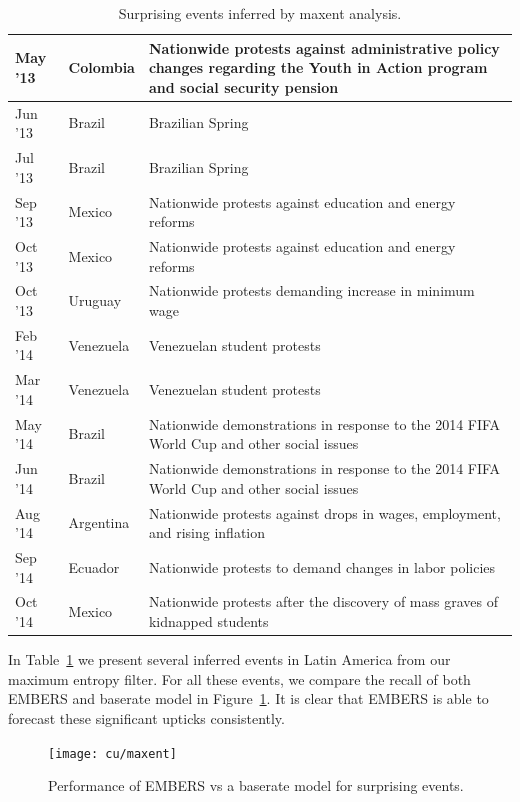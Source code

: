 \begin{table}
  \small
\caption{Surprising events inferred by maxent analysis.}
\renewcommand{\arraystretch}{1.1}
 \centering
 \begin{tabular}{|l|l|m{5cm}|}
 \hline
May '13  &  Colombia	 &  Nationwide protests against administrative policy changes regarding the
Youth in Action program and social security pension \\ \hline
Jun '13  &  Brazil  &  Brazilian Spring \\ \hline
Jul '13  &  Brazil  &  Brazilian Spring \\ \hline
Sep '13  &  Mexico  &  Nationwide protests against education and energy reforms \\ \hline
Oct '13  &  Mexico  &  Nationwide protests against education and energy reforms \\ \hline
Oct '13  &  Uruguay  &  Nationwide protests demanding increase in minimum wage \\ \hline
Feb '14  &  Venezuela	  &  Venezuelan student protests \\ \hline
Mar '14  &  Venezuela  &  	Venezuelan student protests \\ \hline
May '14  &  Brazil  &  Nationwide demonstrations in response to the 2014 FIFA World Cup and other social issues \\ \hline
Jun '14  &  Brazil  &  Nationwide demonstrations in response to the 2014 FIFA World Cup and other social issues \\ \hline
Aug '14  &  Argentina	  &  Nationwide protests against drops in wages, employment, and rising inflation \\ \hline
Sep '14  &  Ecuador  &  Nationwide protests to demand changes in labor policies \\ \hline
Oct '14  &  Mexico  &  Nationwide protests after the discovery of mass graves of kidnapped students  \\ \hline
\end{tabular}
\label{tab:maxentEvents}
\end{table}

In Table~\ref{tab:maxentEvents} we present several inferred events in Latin America from our maximum entropy
filter.
For all these events, we compare the recall of both EMBERS and baserate model
in Figure~\ref{fig:maxent}.
It is clear that EMBERS is able to forecast these significant upticks consistently.

\begin{figure} %
\centering
\texttt{[image: cu/maxent]}
\caption{Performance of EMBERS vs a baserate model for surprising events.}
\label{fig:maxent}
\end{figure}
